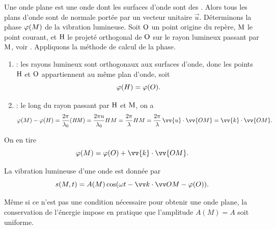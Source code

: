 \documentclass[12pt,fancy]{cours}
\begin{document}
Une onde plane est une onde dont les surfaces d'onde sont des . Alors tous les plans d'onde sont de normale portée par un vecteur unitaire $\Vec{u}$.
Déterminons la phase $\varphi(M)$ de la vibration lumineuse. 
   Soit $\rm O$ un point origine du repère, $\rm M$ le point courant, et $\rm H$ le projeté orthogonal de $\rm O$ sur le rayon lumineux passant par $\rm M$, voir . Appliquons la méthode de calcul de la phase.
   \begin{enumerate}
    \item {} : les rayons lumineux sont orthogonaux aux surfaces d'onde, donc les points $\rm H$ et $\rm O$ appartiennent au même plan d'onde, soit 
    \begin{equation}
    \varphi(H) = \varphi(O).
    \end{equation}
    \item {} : le long du rayon passant par $\rm H$ et $\rm M$, on a 
    \begin{equation}
    \vphi(M) - \vphi(H) = \frac{2\pi}{\lambda_0}\opt{HM} =\frac{2\pi n}{\lambda_0} HM = \frac{2\pi}{\lambda} HM = \frac{2\pi}{\lambda}\,\vv{u}\cdot\vv{OM} = \vv{k}\cdot\vv{OM}.
    \end{equation}
  \end{enumerate}
  On en tire 
  \begin{equation}
  \vphi(M) = \vphi(O) + \vv{k}\cdot\vv{OM}.
  \end{equation}

\begin{theorem}\label{form:}
  La vibration lumineuse d'une onde  est donnée par
  $$
  \vib(M,t)=A(M)\cos( \omega t-\Vec{k}\cdot\Vec{OM} - \vphi(O) ).
  $$
\end{theorem}
\begin{remarque}
  Même si ce n'est pas une condition nécessaire pour obtenir une onde plane, la conservation de l'énergie impose en pratique que l'amplitude $A(M) = A$ soit uniforme.
\end{remarque}
\end{document}
